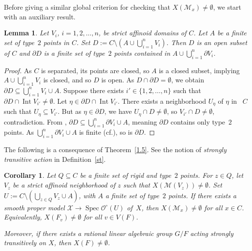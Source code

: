 \documentclass[10pt]{amsart}
\newcommand{\cf}{cf.}
\DeclareMathOperator{\Int}{Int}
\DeclareMathOperator{\Spec}{Spec}
\let\backslash\setminus
\newtheorem{lm}[thm]{Lemma}
\newtheorem{cor}[thm]{Corollary}
\theoremstyle{definition}
\begin{document}
Before giving a similar global criterion for checking that $X(\mathscr{M}_x) \neq \emptyset$, we start with an auxiliary result.\enlargethispage{.5\baselineskip}%

\begin{lm} \label{1.7.1}
Let $V_i$, $i=1,2,\dots, n$, be strict affinoid domains of $C$. Let $A$ be a finite set of type~$2$ points in $C$. Set $D:=C \backslash (A \cup \bigcup_{i=1}^n V_i)$. Then $D$ is an open subset of $C$ and $\partial{D}$ is a finite set of type~$2$ points contained in $A \cup \bigcup_{i=1}^n \partial{V_i}$.
\end{lm}
\begin{proof}
As $C$ is separated, its points are closed, so $A$ is a closed subset, implying $A \cup \bigcup_{i=1}^n V_i$ is closed, and so $D$ is open. As $D \cap \partial{D}=\emptyset$, we obtain $\partial{D} \subseteq \bigcup_{i=1}^n V_i \cup A$. Suppose there exists $i' \in \{1,2,\dots, n\}$ such that $\partial{D} \cap \Int V_{i'} \neq \emptyset$. Let $\eta \in \partial{D} \cap \Int V_{i'}$. There exists a neighborhood $U_{\eta}$ of $\eta$ in ~$C$ such that $U_{\eta} \subseteq V_{i'}$. But as $\eta \in \partial{D}$, we have $U_{\eta} \cap D \neq \emptyset$, so $V_{i'} \cap D \neq \emptyset$, contradiction. From \cite[Cor.\,1.8.11]{doktoratura}, $\partial{D} \subseteq \bigcup_{i=1}^n \partial{V_i} \cup A$, meaning $\partial{D}$ contains only type~$2$ points. As $ \bigcup_{i=1}^n \partial{V_i} \cup A$ is finite (\cf \cite[Prop.\,2.5]{une}), so is $\partial{D}$.
\end{proof}

The following is a consequence of Theorem~\ref{1.5}. See the notion of \emph{strongly transitive action} in Definition~\ref{st}.

\begin{cor} \label{1.7}
Let $Q \subseteq C$ be a finite set of rigid and type~$2$ points. For ${z \in Q}$, let $V_z$ be a strict affinoid neighborhood of $z$ such that $X(\mathscr{M}(V_z)) \neq \emptyset$.
Set ${U:=C \backslash (\bigcup_{z \in Q} V_z \cup A)}$, with $A$ a finite set of type~$2$ points. If there exists a smooth proper model ${\mathcal{X} \to \Spec \mathcal{O}^{\circ}(U)}$ of~$X$,
then $X(\mathscr{M}_x) \neq \emptyset$ for all $x \in C$. Equivalently, $X(F_v) \neq \emptyset$ for all $v \in V(F)$.

Moreover, if there exists a rational linear algebraic group $G/F$ acting strongly transitively on $X$, then $X(F) \neq \emptyset$.
\end{cor}
\end{document}
